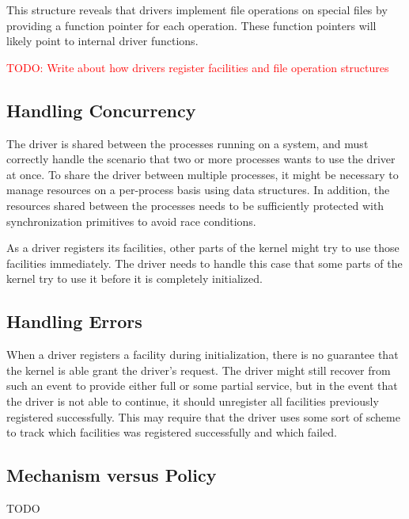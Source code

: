 This structure reveals that drivers implement file operations on special files by providing a function pointer for each operation. These function pointers will likely point to internal driver functions.

\textcolor{red}{TODO: Write about how drivers register facilities and file operation structures}


\subsection{Handling Concurrency}
The driver is shared between the processes running on a system, and must correctly handle the scenario that two or more processes wants to use the driver at once. To share the driver between multiple processes, it might be necessary to manage resources on a per-process basis using data structures. In addition, the resources shared between the processes needs to be sufficiently protected with synchronization primitives to avoid race conditions.

As a driver registers its facilities, other parts of the kernel might try to use those facilities immediately. The driver needs to handle this case that some parts of the kernel try to use it before it is completely initialized.


\subsection{Handling Errors}
When a driver registers a facility during initialization, there is no guarantee that the kernel is able grant the driver's request. The driver might still recover from such an event to provide either full or some partial service, but in the event that the driver is not able to continue, it should unregister all facilities previously registered successfully. This may require that the driver uses some sort of scheme to track which facilities was registered successfully and which failed. 


\subsection{Mechanism versus Policy}
TODO %



